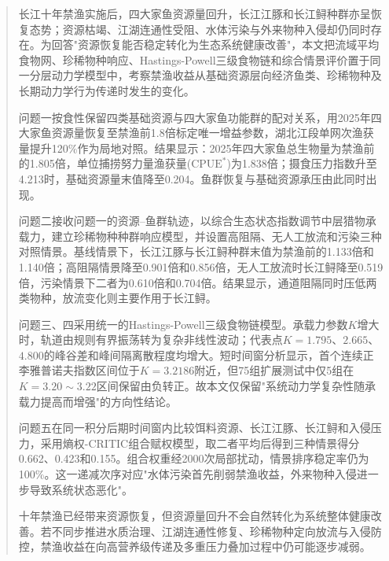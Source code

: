 
\begin{abstract}
长江十年禁渔实施后，四大家鱼资源量回升，长江江豚和长江鲟种群亦呈恢复态势；资源枯竭、江湖连通性受阻、水体污染与外来物种入侵却仍同时存在。为回答"资源恢复能否稳定转化为生态系统健康改善"，本文把流域平均食物网、珍稀物种响应、Hastings-Powell三级食物链和综合情景评价置于同一分层动力学模型中，考察禁渔收益从基础资源层向经济鱼类、珍稀物种及长期动力学行为传递时发生的变化。

问题一按食性保留四类基础资源与四大家鱼功能群的配对关系，用2025年四大家鱼资源量恢复至禁渔前1.8倍标定唯一增益参数，湖北江段单网次渔获量提升120\%作为局地对照。结果显示：2025年四大家鱼总生物量为禁渔前的1.805倍，单位捕捞努力量渔获量($\mathrm{CPUE}^*$)为1.838倍；摄食压力指数升至4.213时，基础资源量末值降至0.204。鱼群恢复与基础资源承压由此同时出现。

问题二接收问题一的资源--鱼群轨迹，以综合生态状态指数调节中层猎物承载力，建立珍稀物种种群响应模型，并设置高阻隔、无人工放流和污染三种对照情景。基线情景下，长江江豚与长江鲟种群末值为禁渔前的1.133倍和1.140倍；高阻隔情景降至0.901倍和0.856倍，无人工放流时长江鲟降至0.519倍，污染情景下二者为0.610倍和0.704倍。结果显示，通道阻隔同时压低两类物种，放流变化则主要作用于长江鲟。

问题三、四采用统一的Hastings-Powell三级食物链模型。承载力参数$K$增大时，轨道由规则有界振荡转为复杂非线性波动；代表点$K=1.795$、$2.665$、$4.800$的峰谷差和峰间隔离散程度均增大。短时间窗分析显示，首个连续正李雅普诺夫指数区间位于$K=3.2186$附近，但75组扩展测试中仅5组在$K=3.20\sim3.22$区间保留由负转正。故本文仅保留"系统动力学复杂性随承载力提高而增强"的方向性结论。

问题五在同一积分后期时间窗内比较饵料资源、长江江豚、长江鲟和入侵压力，采用熵权-CRITIC组合赋权模型，取二者平均后得到三种情景得分0.662、0.423和0.155。组合权重经2000次局部扰动，情景排序稳定率仍为100\%。这一递减次序对应"水体污染首先削弱禁渔收益，外来物种入侵进一步导致系统状态恶化"。

十年禁渔已经带来资源恢复，但资源量回升不会自然转化为系统整体健康改善。若不同步推进水质治理、江湖连通性修复、珍稀物种定向放流与入侵防控，禁渔收益在向高营养级传递及多重压力叠加过程中仍可能逐步减弱。
\end{abstract}

